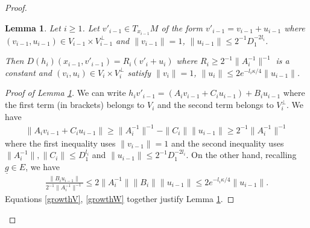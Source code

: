 \documentclass[11pt, leqno, fleqn]{amsart}
\newcommand{\ary}{\begin{eqnarray}}
\newcommand{\eary}{\end{eqnarray}}
\newtheorem{lemma}[thm]{\bf Lemma}
\theoremstyle{definition}
\theoremstyle{definition}
\newcommand{\ug}{{\underline g}}
\begin{document}
\begin{proof}
\begin{lemma}\label{int-lem}
Let $i\geq 1$. Let $v'_{i-1}\in T_{x_{i-1}}M$ of the form $v'_{i-1}=v_{i-1}+u_{i-1}$ where $(v_{i-1},u_{i-1})\in V_{i-1}\times V^\perp_{i-1}$ and  $\|v_{i-1}\|=1$, $\|u_{i-1}\| \leq 2^{-1}D_{1}^{-2l_{i}}$.

Then $D(h_{i})(x_{i-1},v'_{i-1})= R_{i} (v'_{i}+u_{i})$ where $R_{i}\geq 2^{-1}\|A_{i}^{-1}\|^{-1}$ is a constant and $(v_{i},u_{i})\in V_{i}\times  V^\perp_{i}$ satisfy  $\|v_{i}\|=1$, $\|u_{i}\| \leq 2 e^{-l_{i} \kappa/4} \|u_{i-1}\| $.
\end{lemma} 



	
	
\begin{proof}[Proof of Lemma \ref{int-lem}]  
We can write $h_{i} v'_{i-1}= (A_{i} v_{i-1}+C_{i}u_{i-1}) + B_{i} u_{i-1}$ where the first term (in brackets) belongs to $V_{i}$ and the second term belongs to $V^\perp_{i}$. We have 
\ary\label{growthV}
\|A_{i} v_{i-1}+C_{i}u_{i-1}\| \geq \|A_{i}^{-1}\|^{-1} -\|C_{i}\| \|u_{i-1}\|\geq 2^{-1}\|A_{i}^{-1}\|^{-1}
\eary 
where the first inequality uses $\|v_{i-1}\|=1$ and the second inequality uses $\|A^{-1}_{i}\|, \|C_{i}\|\leq D_{1}^{l_{i}}$ and $\|u_{i-1}\|\leq 2^{-1}D_{1}^{-2l_{i}}.$
On the other hand, recalling $\ug\in E$, we have
\ary\label{growthW}
\frac{\|B_{i} u_{i-1}\|}{2^{-1}\|A_{i}^{-1}\|^{-1}}\leq 2 \|A_{i}^{-1}\| \|B_{i} \| \|u_{i-1}\| \leq 2e^{-l_{i}\kappa/4} \|u_{i-1}\|.
\eary 
Equations \eqref{growthV}, \eqref{growthW} together justify Lemma  \ref{int-lem}.	
\end{proof}	 
	
	
	

\end{proof}
\end{document}
